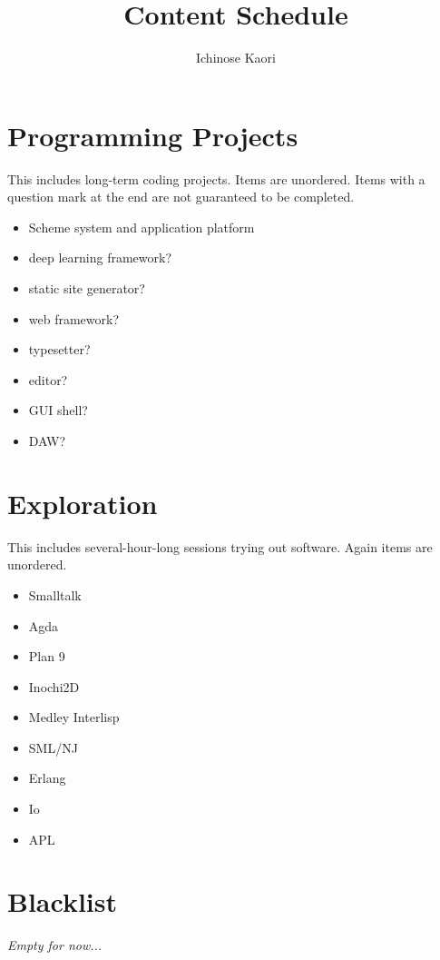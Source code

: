 \documentclass{article}
\title{Content Schedule}
\author{Ichinose Kaori}
\begin{document}
\maketitle

\section{Programming Projects}

This includes long-term coding projects. Items are unordered. Items with a question mark at the end are not guaranteed to be completed.

\begin{itemize}
\item Scheme system and application platform
\item deep learning framework?
\item static site generator?
\item web framework?
\item typesetter?
\item editor?
\item GUI shell?
\item DAW?
\end{itemize}

\section{Exploration}

This includes several-hour-long sessions trying out software. Again items are unordered.

\begin{itemize}
\item Smalltalk
\item Agda
\item Plan 9
\item Inochi2D
\item Medley Interlisp
\item SML/NJ
\item Erlang
\item Io
\item APL
\end{itemize}

\section{Blacklist}

\textit{Empty for now...}
\end{document}
